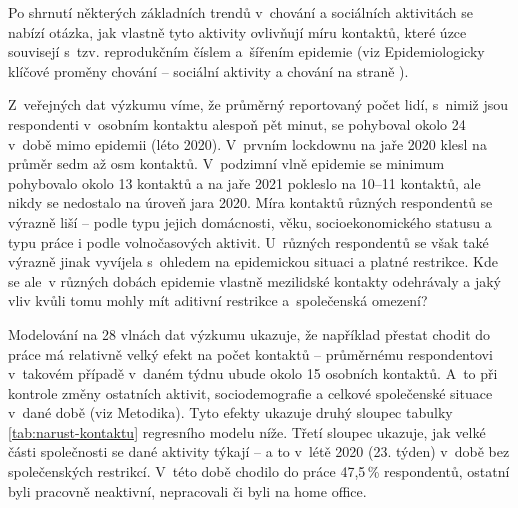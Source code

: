 Po shrnutí některých základních trendů v chování a sociálních aktivitách se nabízí otázka, jak vlastně tyto aktivity ovlivňují míru kontaktů, které úzce souvisejí s tzv. reprodukčním číslem a šířením epidemie (viz Epidemiologicky klíčové proměny cho\-vá\-ní – sociální aktivity a chování na straně \pageref{Epidemi_promeny}). 

Z veřejných dat výzkumu  víme, že průměrný reportovaný počet lidí, s nimiž jsou respondenti v osobním kontaktu alespoň pět minut, se pohyboval okolo 24 v době mimo epidemii (léto 2020). V prvním lockdownu na jaře 2020 klesl na průměr sedm až osm kontaktů. V podzimní vlně epidemie se minimum pohybovalo okolo 13 kontaktů a na jaře 2021 pokleslo na 10--11 kontaktů, ale nikdy se nedostalo na úroveň jara 2020. Míra kontaktů různých respondentů se výrazně liší – podle typu jejich domácnosti, věku, socioekonomického statusu a typu práce i podle volnočasových aktivit. U~různých respondentů se však také výrazně jinak vyvíjela s ohledem na epidemickou situaci a platné restrikce. Kde se ale v různých dobách epidemie vlastně mezilidské kontakty odehrávaly a jaký vliv kvůli tomu mohly mít aditivní restrikce a společenská omezení? 

Modelování na 28 vlnách dat výzkumu  ukazuje, že na\-pří\-klad přestat chodit do práce má relativně velký efekt na počet kontaktů – prů\-měr\-né\-mu respondentovi v takovém případě v daném týdnu ubude okolo 15 osobních kontaktů. A~to při kontrole změny ostatních aktivit, sociodemografie a celkové společenské situace v dané době (viz Metodika). Tyto efekty ukazuje druhý sloupec tabulky \ref{tab:narust-kontaktu} regresního modelu níže. Třetí sloupec ukazuje, jak velké části společnosti se dané aktivity týkají – a to v létě 2020 (23. týden)
v době bez spo\-le\-čen\-ských restrikcí. V~této době chodilo do práce 47,5\,\% respondentů, ostatní byli pracovně neaktivní, nepracovali či byli na home office. 


